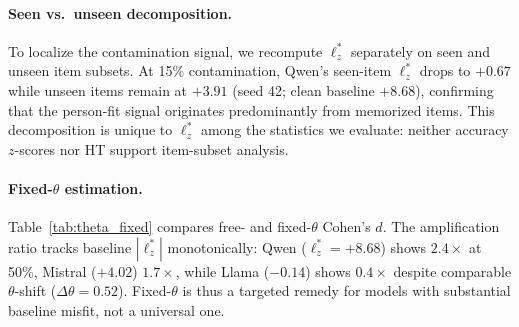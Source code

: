 \paragraph{Seen vs.\ unseen decomposition.}
To localize the contamination signal, we recompute $\ell_z^*$ separately on seen and unseen item subsets.
At 15\% contamination, Qwen's seen-item $\ell_z^*$ drops to $+0.67$ while unseen items remain at $+3.91$ (seed 42; clean baseline $+8.68$), confirming that the person-fit signal originates predominantly from memorized items.
This decomposition is unique to $\ell_z^*$ among the statistics we evaluate: neither accuracy $z$-scores nor HT support item-subset analysis.

\paragraph{Fixed-$\theta$ estimation.}
Table~\ref{tab:theta_fixed} compares free- and fixed-$\theta$ Cohen's $d$.
The amplification ratio tracks baseline $|\ell_z^*|$ monotonically: Qwen ($\ell_z^*{=}{+}8.68$) shows $2.4{\times}$ at 50\%, Mistral ($+4.02$) $1.7{\times}$, while Llama ($-0.14$) shows $0.4{\times}$ despite comparable $\theta$-shift ($\Delta\theta{=}0.52$).
Fixed-$\theta$ is thus a targeted remedy for models with substantial baseline misfit, not a universal one.

